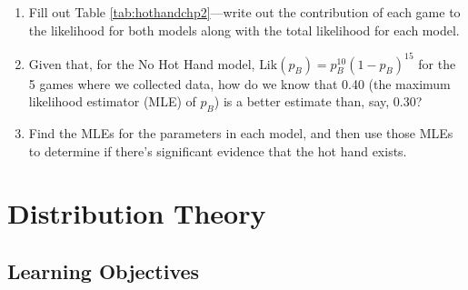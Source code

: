 \documentclass[
]{krantz}
\begin{document}
\begin{enumerate}
  \begin{enumerate}
  \def\labelenumii{\alph{enumii}.}
  \item
    Fill out Table \ref{tab:hothandchp2}---write out the contribution of each game to the likelihood for both models along with the total likelihood for each model.
  \item
    Given that, for the No Hot Hand model, \(\textrm{Lik}(p_B)=p_B^{10}(1-p_B)^{15}\) for the 5 games where we collected data, how do we know that 0.40 (the maximum likelihood estimator (MLE) of \(p_B\)) is a better estimate than, say, 0.30?
  \item
    Find the MLEs for the parameters in each model, and then use those MLEs to determine if there's significant evidence that the hot hand exists.
  \end{enumerate}
\end{enumerate}

\begin{table}

\caption{\label{tab:hothandchp2}Data for Open-ended Exercise 2.  (B = made basket.  M = missed basket.)}
\centering
{}
\end{table}

\hypertarget{ch-distthry}{%
\chapter{Distribution Theory}\label{ch-distthry}}

\hypertarget{learning-objectives-2}{%
\section{Learning Objectives}\label{learning-objectives-2}}
\end{document}
